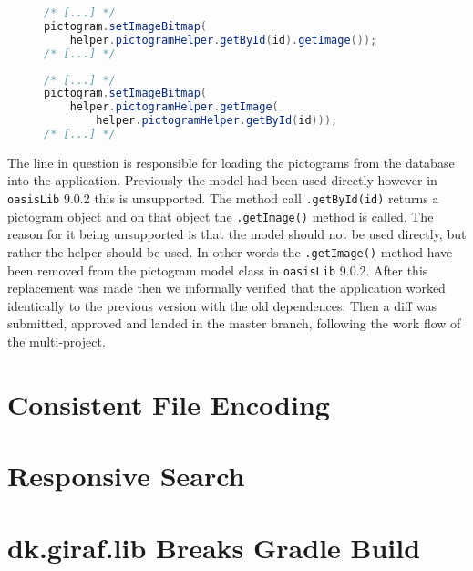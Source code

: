 \begin{description}
    \begin{figure}
        \begin{lstlisting}[language=java, caption={Sequence with deprecated method call. }, label=lst:dep-seq-prev]
/* [...] */
pictogram.setImageBitmap(
    helper.pictogramHelper.getById(id).getImage());
/* [...] */
        \end{lstlisting}
    \end{figure}
    \begin{figure}
        \begin{lstlisting}[language=java, caption={Sequence using the replacement code. }, label=lst:dep-seq-upd]
/* [...] */
pictogram.setImageBitmap(
    helper.pictogramHelper.getImage(
        helper.pictogramHelper.getById(id)));
/* [...] */
        \end{lstlisting}
    \end{figure}
    The line in question is responsible for loading the pictograms from the database into the application. 
    Previously the model had been used directly however in \texttt{oasisLib} 9.0.2 this is unsupported.
    The method call \texttt{.getById(id)} returns a pictogram object and on that object the \texttt{.getImage()} method is called.
    The reason for it being unsupported is that the model should not be used directly, but rather the helper should be used.
    In other words the \texttt{.getImage()} method have been removed from the pictogram model class in \texttt{oasisLib} 9.0.2. 
    After this replacement was made then we informally verified that the application worked identically to the previous version with the old dependences.
    Then a diff was submitted, approved and landed in the master branch, following the work flow of the multi-project. 
\end{description}


\section{Consistent File Encoding}
\section{Responsive Search}

\section{dk.giraf.lib Breaks Gradle Build}

